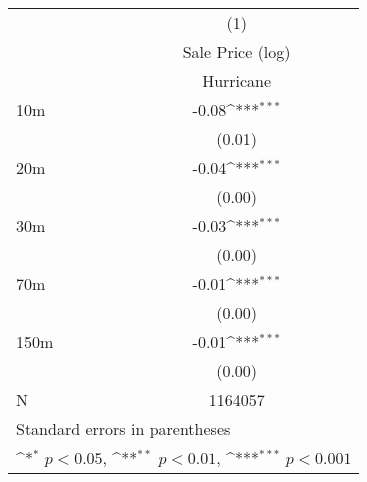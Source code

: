 {
\def\sym#1{\ifmmode^{#1}\else\(^{#1}\)\fi}
\begin{tabular}{l*{1}{c}}
\hline\hline
                    &\multicolumn{1}{c}{(1)}\\
                    &\multicolumn{1}{c}{Sale Price (log)}\\
                    &        Hurricane        \\
\hline
10m                 &       -0.08\sym{***}\\
                    &      (0.01)         \\
[1em]
20m                 &       -0.04\sym{***}\\
                    &      (0.00)         \\
[1em]
30m                 &       -0.03\sym{***}\\
                    &      (0.00)         \\
[1em]
70m                 &       -0.01\sym{***}\\
                    &      (0.00)         \\
[1em]
150m                &       -0.01\sym{***}\\
                    &      (0.00)         \\
\hline
N                   &     1164057         \\
\hline\hline
\multicolumn{2}{l}{\footnotesize Standard errors in parentheses}\\
\multicolumn{2}{l}{\footnotesize \sym{*} \(p<0.05\), \sym{**} \(p<0.01\), \sym{***} \(p<0.001\)}\\
\end{tabular}
}
